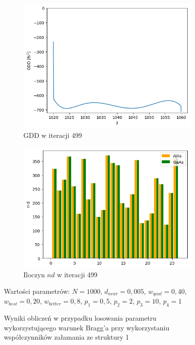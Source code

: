 \begin{figure} [ht!]
\begin{subfigure}[b]{0.31\textwidth}
        \includegraphics[width=\linewidth]{figures/wyniki/1stopien/fcelptp/result_gdd1.png}
        \caption{GDD w iteracji 499}
    \end{subfigure}
        \begin{subfigure}[b]{0.32\textwidth}
        \includegraphics[width=\linewidth]{figures/wyniki/1stopien/fcelptp/result_nd1.png}
        \caption{Iloczyn $nd$ w iteracji 499}
    \end{subfigure}
    \caption{Wyniki obliczeń w przypadku losowania parametru wykorzystującego warunek Bragg'a przy wykorzystaniu współczynników załamania ze struktury 1}
    Wartości parametrów: $N= 1000$, $d_{near}= 0,005$, $w_{qual}=0,40$, $w_{best}=0,20$, $w_{better}=0,8$, $p_1=0,5$, $p_2=2$, $p_3=10$, $p_4=1$
    \label{fig:wyn1stp}
\end{figure}

